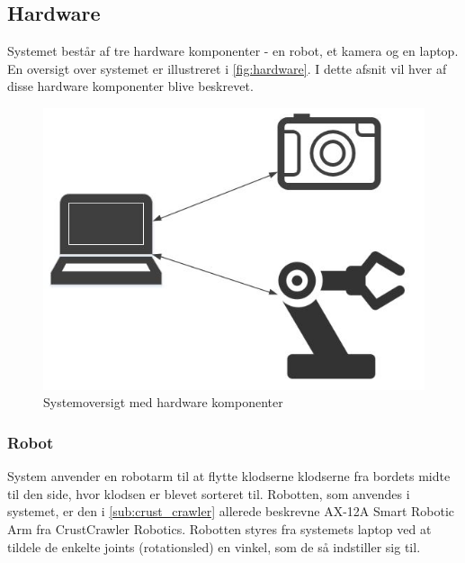 \subsection{Hardware} %
\label{sub:hardware}

Systemet består af tre hardware komponenter - en robot, et kamera og en laptop. En oversigt over systemet er illustreret i \autoref{fig:hardware}. I dette afsnit vil hver af disse hardware komponenter blive beskrevet.


\begin{figure}[h]
\centering
\includegraphics[scale=0.5]{images/hardware}
\caption{Systemoversigt med hardware komponenter}
\label{fig:hardware}
\end{figure}

\subsubsection{Robot} %
\label{subsub:robot}


System anvender en robotarm til at flytte klodserne klodserne fra bordets midte til den side, hvor klodsen er blevet sorteret til. Robotten, som anvendes i systemet, er den i \autoref{sub:crust_crawler} allerede beskrevne AX-12A Smart Robotic Arm fra CrustCrawler Robotics. Robotten styres fra systemets laptop ved at tildele de enkelte joints (rotationsled) en vinkel, som de så indstiller sig til.


